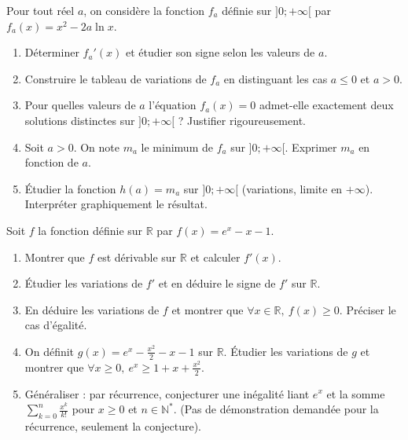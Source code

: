 \documentclass[11pt]{article}
\begin{document}
\begin{exercice}
Pour tout réel $a$, on considère la fonction $f_a$ définie sur $]0 ; +\infty[$ par $f_a(x) = x^2 - 2a\ln x$.
\begin{enumerate}
    \item Déterminer $f_a'(x)$ et étudier son signe selon les valeurs de $a$.
    \item Construire le tableau de variations de $f_a$ en distinguant les cas $a \leqslant 0$ et $a > 0$.
    \item Pour quelles valeurs de $a$ l'équation $f_a(x) = 0$ admet-elle exactement deux solutions distinctes sur $]0 ; +\infty[$ ? Justifier rigoureusement.
    \item Soit $a > 0$. On note $m_a$ le minimum de $f_a$ sur $]0 ; +\infty[$. Exprimer $m_a$ en fonction de $a$.
    \item Étudier la fonction $h(a) = m_a$ sur $]0 ; +\infty[$ (variations, limite en $+\infty$). Interpréter graphiquement le résultat.
\end{enumerate}
\end{exercice}

\begin{exercice}
Soit $f$ la fonction définie sur $\mathbb{R}$ par $f(x) = e^x - x - 1$.
\begin{enumerate}
    \item Montrer que $f$ est dérivable sur $\mathbb{R}$ et calculer $f'(x)$.
    \item Étudier les variations de $f'$ et en déduire le signe de $f'$ sur $\mathbb{R}$.
    \item En déduire les variations de $f$ et montrer que $\forall x \in \mathbb{R},\ f(x) \geqslant 0$. Préciser le cas d'égalité.
    \item On définit $g(x) = e^x - \frac{x^2}{2} - x - 1$ sur $\mathbb{R}$. Étudier les variations de $g$ et montrer que $\forall x \geqslant 0,\ e^x \geqslant 1 + x + \frac{x^2}{2}$.
    \item Généraliser : par récurrence, conjecturer une inégalité liant $e^x$ et la somme $\sum_{k=0}^{n} \frac{x^k}{k!}$ pour $x \geqslant 0$ et $n \in \mathbb{N}^*$. (Pas de démonstration demandée pour la récurrence, seulement la conjecture).
\end{enumerate}
\end{exercice}
\end{document}
